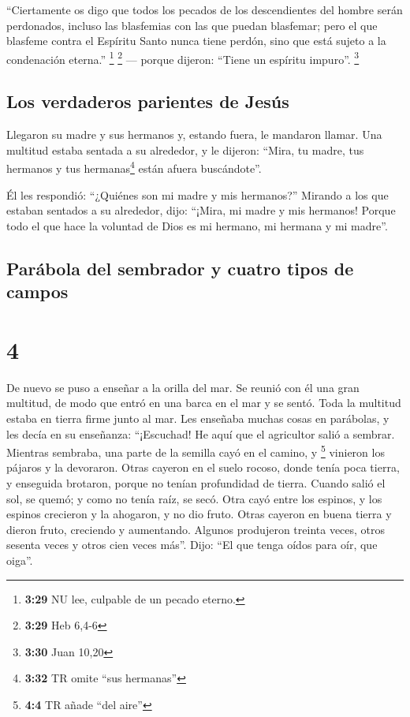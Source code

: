  ``Ciertamente os digo que todos los pecados de los
descendientes del hombre serán perdonados, incluso las blasfemias con
las que puedan blasfemar;  pero el que blasfeme contra el
Espíritu Santo nunca tiene perdón, sino que está sujeto a la condenación
eterna.'' \footnote{\textbf{3:29} NU lee, culpable de un pecado eterno.}
\footnote{\textbf{3:29} Heb 6,4-6}  --- porque dijeron:
``Tiene un espíritu impuro''. \footnote{\textbf{3:30} Juan 10,20}

\hypertarget{los-verdaderos-parientes-de-jesuxfas}{%
\subsection{Los verdaderos parientes de
Jesús}\label{los-verdaderos-parientes-de-jesuxfas}}

 Llegaron su madre y sus hermanos y, estando fuera, le
mandaron llamar.  Una multitud estaba sentada a su
alrededor, y le dijeron: ``Mira, tu madre, tus hermanos y tus
hermanas\footnote{\textbf{3:32} TR omite ``sus hermanas''} están afuera
buscándote''.

 Él les respondió: ``¿Quiénes son mi madre y mis
hermanos?''  Mirando a los que estaban sentados a su
alrededor, dijo: ``¡Mira, mi madre y mis hermanos! 
Porque todo el que hace la voluntad de Dios es mi hermano, mi hermana y
mi madre''.

\hypertarget{paruxe1bola-del-sembrador-y-cuatro-tipos-de-campos}{%
\subsection{Parábola del sembrador y cuatro tipos de
campos}\label{paruxe1bola-del-sembrador-y-cuatro-tipos-de-campos}}

\hypertarget{section-3}{%
\section{4}\label{section-3}}

 De nuevo se puso a enseñar a la orilla del mar. Se reunió
con él una gran multitud, de modo que entró en una barca en el mar y se
sentó. Toda la multitud estaba en tierra firme junto al mar.
 Les enseñaba muchas cosas en parábolas, y les decía en su
enseñanza:  ``¡Escuchad! He aquí que el agricultor salió a
sembrar.  Mientras sembraba, una parte de la semilla cayó
en el camino, y \footnote{\textbf{4:4} TR añade ``del aire''} vinieron
los pájaros y la devoraron.  Otras cayeron en el suelo
rocoso, donde tenía poca tierra, y enseguida brotaron, porque no tenían
profundidad de tierra.  Cuando salió el sol, se quemó; y
como no tenía raíz, se secó.  Otra cayó entre los espinos,
y los espinos crecieron y la ahogaron, y no dio fruto. 
Otras cayeron en buena tierra y dieron fruto, creciendo y aumentando.
Algunos produjeron treinta veces, otros sesenta veces y otros cien veces
más''.  Dijo: ``El que tenga oídos para oír, que oiga''.

